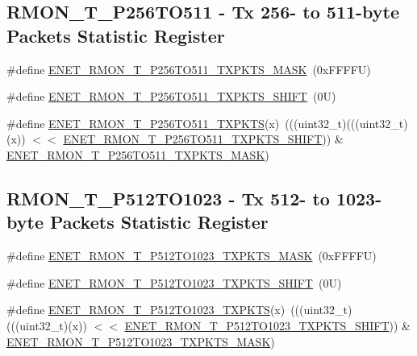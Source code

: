 \subsection*{R\+M\+O\+N\+\_\+\+T\+\_\+\+P256\+T\+O511 -\/ Tx 256-\/ to 511-\/byte Packets Statistic Register}
\begin{DoxyCompactItemize}
\item 
\#define \mbox{\hyperlink{group___e_n_e_t___register___masks_ga85bc090787f3d1078d6f9181f4bbb671}{E\+N\+E\+T\+\_\+\+R\+M\+O\+N\+\_\+\+T\+\_\+\+P256\+T\+O511\+\_\+\+T\+X\+P\+K\+T\+S\+\_\+\+M\+A\+SK}}~(0x\+F\+F\+F\+F\+U)
\item 
\#define \mbox{\hyperlink{group___e_n_e_t___register___masks_gae24403acde1f82a26d37e32743c259cf}{E\+N\+E\+T\+\_\+\+R\+M\+O\+N\+\_\+\+T\+\_\+\+P256\+T\+O511\+\_\+\+T\+X\+P\+K\+T\+S\+\_\+\+S\+H\+I\+FT}}~(0\+U)
\item 
\#define \mbox{\hyperlink{group___e_n_e_t___register___masks_gab00f7d9c011f220e5022eda482c3d411}{E\+N\+E\+T\+\_\+\+R\+M\+O\+N\+\_\+\+T\+\_\+\+P256\+T\+O511\+\_\+\+T\+X\+P\+K\+TS}}(x)~(((uint32\+\_\+t)(((uint32\+\_\+t)(x)) $<$$<$ \mbox{\hyperlink{group___e_n_e_t___register___masks_gae24403acde1f82a26d37e32743c259cf}{E\+N\+E\+T\+\_\+\+R\+M\+O\+N\+\_\+\+T\+\_\+\+P256\+T\+O511\+\_\+\+T\+X\+P\+K\+T\+S\+\_\+\+S\+H\+I\+FT}})) \& \mbox{\hyperlink{group___e_n_e_t___register___masks_ga85bc090787f3d1078d6f9181f4bbb671}{E\+N\+E\+T\+\_\+\+R\+M\+O\+N\+\_\+\+T\+\_\+\+P256\+T\+O511\+\_\+\+T\+X\+P\+K\+T\+S\+\_\+\+M\+A\+SK}})
\end{DoxyCompactItemize}
\subsection*{R\+M\+O\+N\+\_\+\+T\+\_\+\+P512\+T\+O1023 -\/ Tx 512-\/ to 1023-\/byte Packets Statistic Register}
\begin{DoxyCompactItemize}
\item 
\#define \mbox{\hyperlink{group___e_n_e_t___register___masks_gaf14272bdf0f12949bf600b571553adcb}{E\+N\+E\+T\+\_\+\+R\+M\+O\+N\+\_\+\+T\+\_\+\+P512\+T\+O1023\+\_\+\+T\+X\+P\+K\+T\+S\+\_\+\+M\+A\+SK}}~(0x\+F\+F\+F\+F\+U)
\item 
\#define \mbox{\hyperlink{group___e_n_e_t___register___masks_ga4a580b8a12cf238b78636beddc069555}{E\+N\+E\+T\+\_\+\+R\+M\+O\+N\+\_\+\+T\+\_\+\+P512\+T\+O1023\+\_\+\+T\+X\+P\+K\+T\+S\+\_\+\+S\+H\+I\+FT}}~(0\+U)
\item 
\#define \mbox{\hyperlink{group___e_n_e_t___register___masks_ga22c752d3df4c9638eae841367dcd8e04}{E\+N\+E\+T\+\_\+\+R\+M\+O\+N\+\_\+\+T\+\_\+\+P512\+T\+O1023\+\_\+\+T\+X\+P\+K\+TS}}(x)~(((uint32\+\_\+t)(((uint32\+\_\+t)(x)) $<$$<$ \mbox{\hyperlink{group___e_n_e_t___register___masks_ga4a580b8a12cf238b78636beddc069555}{E\+N\+E\+T\+\_\+\+R\+M\+O\+N\+\_\+\+T\+\_\+\+P512\+T\+O1023\+\_\+\+T\+X\+P\+K\+T\+S\+\_\+\+S\+H\+I\+FT}})) \& \mbox{\hyperlink{group___e_n_e_t___register___masks_gaf14272bdf0f12949bf600b571553adcb}{E\+N\+E\+T\+\_\+\+R\+M\+O\+N\+\_\+\+T\+\_\+\+P512\+T\+O1023\+\_\+\+T\+X\+P\+K\+T\+S\+\_\+\+M\+A\+SK}})
\end{DoxyCompactItemize}
